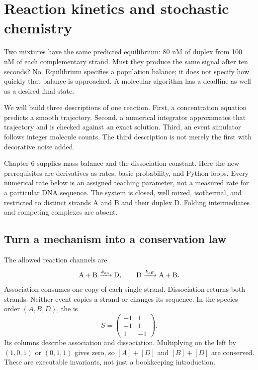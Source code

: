 \chapter{Reaction kinetics and stochastic chemistry}

Two mixtures have the same predicted equilibrium: 80 nM of duplex from
100 nM of each complementary strand. Must they produce the same signal
after ten seconds? No. Equilibrium specifies a population balance; it does
not specify how quickly that balance is approached. A molecular algorithm
has a deadline as well as a desired final state.

We will build three descriptions of one reaction. First, a concentration
equation predicts a smooth trajectory. Second, a numerical integrator
approximates that trajectory and is checked against an exact solution.
Third, an event simulator follows integer molecule counts. The third
description is not merely the first with decorative noise added.

Chapter 6 supplies mass balance and the dissociation constant. Here the
new prerequisites are derivatives as rates, basic probability, and Python
loops. Every numerical rate below is an assigned teaching parameter,
not a measured rate for a particular DNA sequence. The system is closed,
well mixed, isothermal, and restricted to distinct strands A and B and
their duplex D. Folding intermediates and competing complexes are absent.

\section{Turn a mechanism into a conservation law}

The allowed reaction channels are
\begin{equation}
 \mathrm{A+B}\xrightarrow{k_{\rm on}}\mathrm{D},
 \qquad \mathrm{D}\xrightarrow{k_{\rm off}}\mathrm{A+B}.
\end{equation}
Association consumes one copy of each single strand. Dissociation returns
both strands. Neither event copies a strand or changes its sequence.
In the species order $(A,B,D)$, the  is
\begin{equation}
 S=\begin{pmatrix}-1&1\\-1&1\\1&-1\end{pmatrix}.
 \label{eq:stoich}
\end{equation}
Its columns describe association and dissociation. Multiplying on the left
by $(1,0,1)$ or $(0,1,1)$ gives zero, so $[A]+[D]$ and $[B]+[D]$ are conserved.
These are executable invariants, not just a bookkeeping introduction.


